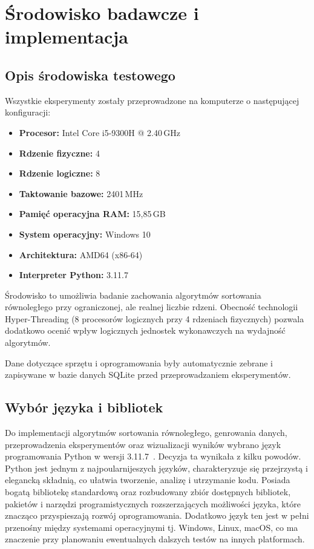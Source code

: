 \cleardoublepage
\chapter{Środowisko badawcze i implementacja}
\label{cha:SrodowiskoImplementacja}

\section{Opis środowiska testowego}
\label{sec:SrodowiskaTestowe}

Wszystkie eksperymenty zostały przeprowadzone na komputerze o następującej konfiguracji:

\begin{itemize}
    \item \textbf{Procesor:} Intel Core i5-9300H @ 2.40\,GHz
    \item \textbf{Rdzenie fizyczne:} 4
    \item \textbf{Rdzenie logiczne:} 8 
    \item \textbf{Taktowanie bazowe:} 2401\,MHz
    \item \textbf{Pamięć operacyjna RAM:} 15,85\,GB
    \item \textbf{System operacyjny:} Windows 10
    \item \textbf{Architektura:} AMD64 (x86-64)
    \item \textbf{Interpreter Python:} 3.11.7
\end{itemize}

Środowisko to umożliwia badanie zachowania algorytmów sortowania równoległego przy ograniczonej, ale realnej liczbie rdzeni. 
Obecność technologii Hyper-Threading (8 procesorów logicznych przy 4 rdzeniach fizycznych) pozwala dodatkowo ocenić wpływ 
logicznych jednostek wykonawczych na wydajność algorytmów.

Dane dotyczące sprzętu i oprogramowania były automatycznie zebrane i zapisywane w bazie danych SQLite przed przeprowadzaniem eksperymentów.

\section{Wybór języka i bibliotek}
\label{sec:JezykBiblioteki}

Do implementacji algorytmów sortowania równoległego, genrowania danych, przeprowadzenia eksperymentów oraz wizualizacji wyników wybrano 
język programowania Python w wersji 3.11.7~\cite{bib:Python}. Decyzja ta wynikała z kilku powodów. Python jest jednym z najpoularnijeszych 
języków, charakteryzuje się przejrzystą i elegancką składnią, co ułatwia tworzenie, analizę i utrzymanie kodu. 
Posiada bogatą bibliotekę standardową oraz rozbudowany zbiór dostępnych bibliotek, pakietów i narzędzi programistycznych rozszerzających 
możliwości języka, które znacząco przyspieszają rozwój oprogramowania. Dodatkowo język ten jest w pełni przenośny między systemami 
operacyjnymi tj. Windows, Linux, macOS, co ma znaczenie przy planowaniu ewentualnych dalszych testów na innych platformach.

